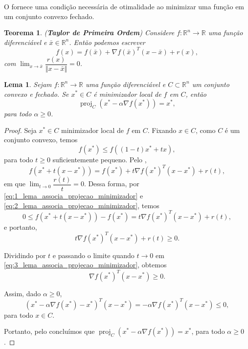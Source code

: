 \documentclass[12pt,a4paper]{scrartcl}
\DeclareMathOperator{\proj}{proj}
\def\RR{\mathds{R}}
\def\xbar{\bar{x}}
\newtheorem{teo}{Teorema}
\newtheorem{lema}{Lema}
\theoremstyle{definition}%
\begin{document}
O  fornece uma condição necessária de otimalidade ao minimizar uma função em um conjunto convexo fechado.

\begin{teo}(\textbf{Taylor de Primeira Ordem}) {\cite[p.25]{Ademir2013}} \label{teo:Taylor_primeira_ordem}
Considere $f:\RR^{n} \rightarrow \RR$ uma função diferenciável e $\xbar \in \RR^{n}$. Então podemos escrever
\[
f(x) = f(\xbar) + \nabla f(\xbar)^{T}(x-\xbar) + r(x),
\]
com $\lim_{x \rightarrow \xbar}\dfrac{r(x)}{\Vert x-\xbar \Vert} = 0$.
\end{teo}


\begin{lema} \label{lema:associa_projecao_minimizador}
Sejam $f: \RR^{n} \rightarrow \RR$ uma função diferenciável e $C \subset \RR^{n}$ um conjunto convexo e fechado. Se $x^{*} \in C$ é minimizador local de $f$ em $C$, então
\[
\proj_{C} (x^{*} - \alpha \nabla f(x^{*})) = x^{*} ,
\]
para todo $\alpha \geq 0$.
\end{lema}
\begin{proof}
Seja $x^{*} \in C$ minimizador local de $f$ em $C$. Fixando $x\in C$, como $C$ é um conjunto convexo, temos
\[ \label{eq:1_lema_associa_projecao_minimizador}
f(x^{*}) \leq f((1-t)x^{*} + tx),
\]
para todo $t\geq 0$ suficientemente pequeno. Pelo , 
\[ \label{eq:2_lema_associa_projecao_minimizador}
f(x^{*}+t(x-x^{*})) = f(x^{*}) + t\nabla f(x^{*})^{T}(x-x^{*}) + r(t) ,
\]
em que $\lim_{t\rightarrow 0} \dfrac{r(t)}{t} = 0$. Dessa forma, por \eqref{eq:1_lema_associa_projecao_minimizador} e \eqref{eq:2_lema_associa_projecao_minimizador}, temos
\[
0 \leq f(x^{*}+t(x-x^{*})) - f(x^{*}) = t\nabla f(x^{*})^{T}(x-x^{*}) + r(t) ,
\]
e portanto, 
\[ \label{eq:3_lema_associa_projecao_minimizador}
t\nabla f(x^{*})^{T}(x-x^{*}) + r(t) \geq 0.
\]

Dividindo por $t$ e passando o limite quando $t \rightarrow 0$ em \eqref{eq:3_lema_associa_projecao_minimizador}, obtemos
\[
\nabla f(x^{*})^{T}(x-x^{*}) \geq 0.
\]

Assim, dado $\alpha \geq 0$,
\[
(x^{*} - \alpha \nabla f(x^{*}) - x^{*})^{T}(x-x^{*}) = -\alpha \nabla f(x^{*})^{T}(x-x^{*}) \leq 0,
\]
para todo $x\in C$.

Portanto, pelo  concluímos que $\proj_{C} (x^{*} - \alpha \nabla f(x^{*})) = x^{*}$, para todo $\alpha \geq 0$.
\end{proof}


\end{document}
